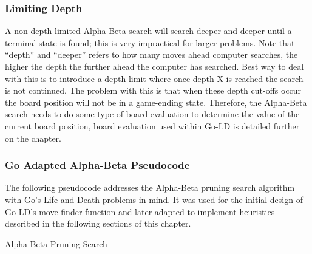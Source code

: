 \documentclass{l4proj}
\begin{document}
\subsubsection{Limiting Depth}
A non-depth limited Alpha-Beta search will search deeper and deeper until a terminal state is found; this is very impractical for larger problems. Note that “depth” and “deeper” refers to how many moves ahead computer searches, the higher the depth the further ahead the computer has searched. Best way to deal with this is to introduce a depth limit where once depth X is reached the search is not continued. The problem with this is that when these depth cut-offs occur the board position will not be in a game-ending state. Therefore, the Alpha-Beta search needs to do some type of board evaluation to determine the value of the current board position, board evaluation used within Go-LD is detailed further on the chapter.

\subsubsection{Go Adapted Alpha-Beta Pseudocode}
The following pseudocode addresses the Alpha-Beta pruning search algorithm with Go's Life and Death problems in mind. It was used for the initial design of Go-LD's move finder function and later adapted to implement heuristics described in the following sections of this chapter.

\begin{algorithm}[H]
\caption{Alpha Beta Pruning Search}\label{Alpha-Beta}
    \DontPrintSemicolon
\end{algorithm}
\end{document}
